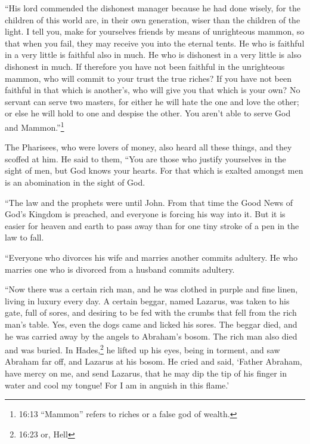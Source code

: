  ``His lord commended the dishonest manager because he had
done wisely, for the children of this world are, in their own
generation, wiser than the children of the light.  I tell
you, make for yourselves friends by means of unrighteous mammon, so that
when you fail, they may receive you into the eternal tents.
 He who is faithful in a very little is faithful also in
much. He who is dishonest in a very little is also dishonest in much.
 If therefore you have not been faithful in the unrighteous
mammon, who will commit to your trust the true riches?  If
you have not been faithful in that which is another's, who will give you
that which is your own?  No servant can serve two masters,
for either he will hate the one and love the other; or else he will hold
to one and despise the other. You aren't able to serve God and
Mammon.''\footnote{16:13 ``Mammon'' refers to riches or a false god of
  wealth.}

 The Pharisees, who were lovers of money, also heard all
these things, and they scoffed at him.  He said to them,
``You are those who justify yourselves in the sight of men, but God
knows your hearts. For that which is exalted amongst men is an
abomination in the sight of God.

 ``The law and the prophets were until John. From that time
the Good News of God's Kingdom is preached, and everyone is forcing his
way into it.  But it is easier for heaven and earth to pass
away than for one tiny stroke of a pen in the law to fall.

 ``Everyone who divorces his wife and marries another
commits adultery. He who marries one who is divorced from a husband
commits adultery.

 ``Now there was a certain rich man, and he was clothed in
purple and fine linen, living in luxury every day.  A
certain beggar, named Lazarus, was taken to his gate, full of sores,
 and desiring to be fed with the crumbs that fell from the
rich man's table. Yes, even the dogs came and licked his sores.
 The beggar died, and he was carried away by the angels to
Abraham's bosom. The rich man also died and was buried.  In
Hades,\footnote{16:23 or, Hell} he lifted up his eyes, being in torment,
and saw Abraham far off, and Lazarus at his bosom.  He
cried and said, `Father Abraham, have mercy on me, and send Lazarus,
that he may dip the tip of his finger in water and cool my tongue! For I
am in anguish in this flame.'

